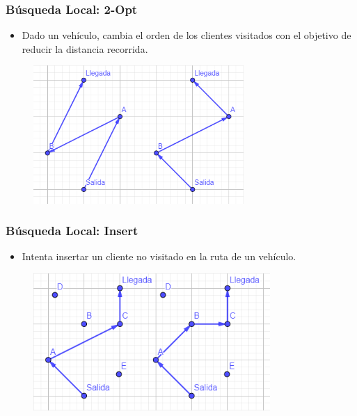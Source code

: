 \documentclass{beamer}
\begin{document}

\begin{frame}
\frametitle{Búsqueda Local: 2-Opt}

\begin{itemize}
    \item Dado un vehículo, cambia el orden de los clientes visitados con el objetivo de reducir la distancia recorrida.
\end{itemize}

\begin{figure}[h]
	\centering
	\includegraphics[width=8cm]{bl2opt}
	\label{fig:bl2opt}
\end{figure}

\end{frame}


\begin{frame}
\frametitle{Búsqueda Local: Insert}

\begin{itemize}
    \item Intenta insertar un cliente no visitado en la ruta de un vehículo.
\end{itemize}

\begin{figure}[h]
	\centering
	\includegraphics[width=9cm]{blinsert}
	\label{fig:blinsert}
\end{figure}

\end{frame}
\end{document}
